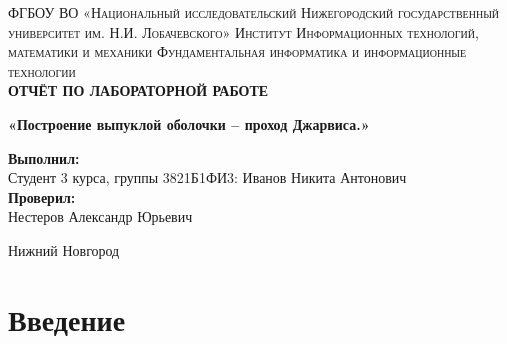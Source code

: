 \documentclass[a4paper, 12pt]{article}
\begin{document}
\begin{titlepage}
\begin{center}
\textsc{\normalsize ФГБОУ ВО «Национальный исследовательский Нижегородский
государственный университет им. Н.И. Лобачевского»
\vspace{5pt}
\break Институт Информационных технологий, математики и механики
\vspace{5pt}
\break Фундаментальная информатика и информационные технологии}\\



\vspace{150pt}
\textbf{\Large ОТЧЁТ ПО ЛАБОРАТОРНОЙ РАБОТЕ}\\
\vspace{15pt}

\textbf{\large «Построение выпуклой оболочки – проход Джарвиса.»}\\
\vspace{10pt}
\end{center}

\vspace{250pt}

\hfill
\begin{minipage}{.5\textwidth}
\textbf{Выполнил:\\[0.5mm]}
Студент 3 курса, группы 3821Б1ФИ3:
\break Иванов Никита Антонович\\[5mm]

\textbf{Проверил:\\[2mm]}
Нестеров Александр Юрьевич\\
\end{minipage}%
\vfill
\begin{center}
 Нижний Новгород
\end{center}
\end{titlepage}

\renewcommand*\contentsname{Содержание}
\newpage
\tableofcontents


\newpage


\section{Введение}
\end{document}
